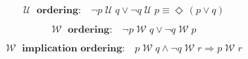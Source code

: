 \documentclass[12pt, fleqn, leqno]{article}
\newcommand{\impl}{\ensuremath{\Rightarrow}}        %
\newcommand{\Until}{\;\mathcal{U}\;}
\newcommand{\Wait}{\;\mathcal{W}\;}
\newcommand{\Event}{\Diamond\,}
\newcommand{\spacer}{\vspace{-30pt}}
\begin{document}
\spacer

\begin{equation}\label{E:untilOrdering}
\textbf{$\Until$ ordering:}\quad \neg p \Until q \lor \neg q \Until p \equiv \Event(p\lor q)
\end{equation}

\spacer

\begin{equation}\label{E:waitOrdering}
\textbf{$\Wait$ ordering:}\quad \neg p \Wait q \lor \neg q \Wait p
\end{equation}

\spacer

\begin{equation}\label{E:waitImplicationOrdering}
\textbf{$\Wait$ implication ordering:}\quad p \Wait q \land \neg q \Wait r \impl p \Wait r
\end{equation}
\end{document}
